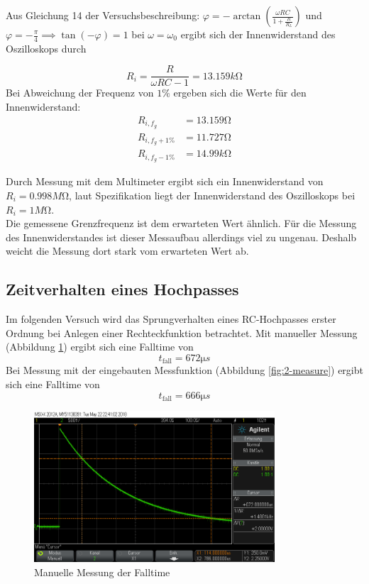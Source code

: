 \documentclass[a4paper]{article}
\begin{document}
Aus Gleichung 14 der Versuchsbeschreibung: $\varphi = -\arctan{(\frac{\omega R C}{1+ \frac{R}{R_L}})}$ und $\varphi = -\frac{\pi}{4} \implies \tan{(-\varphi)}=1$ bei $\omega = \omega_0$ ergibt sich der Innenwiderstand des Oszilloskops durch


\begin{equation*}
    R_i=\frac{R}{\omega R C - 1}=13.159\si{k\ohm}
\end{equation*}
Bei Abweichung der Frequenz von $1\%$ ergeben sich die Werte für den Innenwiderstand:
\begin{equation*}
    \begin{split}
        R_{i,f_g}     &= 13.159\si{\ohm}\\
        R_{i,f_g+1\%} &= 11.727\si{\ohm}\\
        R_{i,f_g-1\%} &= 14.99\si{k\ohm}
    \end{split}
\end{equation*}

Durch Messung mit dem Multimeter ergibt sich ein Innenwiderstand von
$R_i=0.998\si{M\ohm}$, laut Spezifikation liegt der Innenwiderstand des Oszilloskops bei $R_i=1\si{M\ohm}$.\\
Die gemessene Grenzfrequenz ist dem erwarteten Wert ähnlich. Für die Messung des Innenwiderstandes ist dieser Messaufbau allerdings viel zu ungenau. Deshalb weicht die Messung dort stark vom erwarteten Wert ab.

\subsection{Zeitverhalten eines Hochpasses}
Im folgenden Versuch wird das Sprungverhalten eines RC-Hochpasses erster Ordnung bei Anlegen einer Rechteckfunktion betrachtet.
Mit manueller Messung (Abbildung \ref{fig:2-manuell}) ergibt sich eine Falltime von
\begin{equation*}
    t_{\text{fall}} = 672\si{\micro s}
\end{equation*}
Bei Messung mit der eingebauten Messfunktion (Abbildung \ref{fig:2-measure}) ergibt sich eine Falltime von
\begin{equation*}
    t_{\text{fall}} = 666\si{\micro s}
\end{equation*}

\begin{figure}[H]
    \centering
    \includegraphics[width=0.8\textwidth]{versuch2/manuell.png}
    \caption{Manuelle Messung der Falltime}
    \label{fig:2-manuell}
\end{figure}
\end{document}
